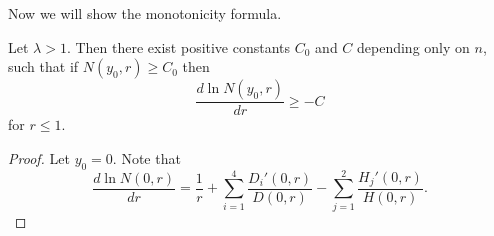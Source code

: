 \documentclass[a4paper, 12pt, onecolumn]{article} \textwidth 148mm
\begin{document}
Now we will show the monotonicity formula.

\begin{theorem}\label{monotonicity formula}
Let $\lambda>1$. Then there exist positive constants $C_0$ and $C$ depending only on $n$, such that if $N(y_0,r)\geq C_0$ then
\begin{equation}\label{lemma monotonicity formula}
\frac{d\ln N(y_0,r)}{dr}\geq-C
\end{equation}
for $r\leq1$.
\end{theorem}

\begin{proof}
Let $y_0=0$. Note that
\begin{equation*}
\frac{d\ln N(0,r)}{dr}=\frac{1}{r}+\sum\limits_{i=1}^4\frac{D_i'(0,r)}{D(0,r)}-\sum\limits_{j=1}^2\frac{H_j'(0,r)}{H(0,r)}.
\end{equation*}


\end{proof}
\end{document}
